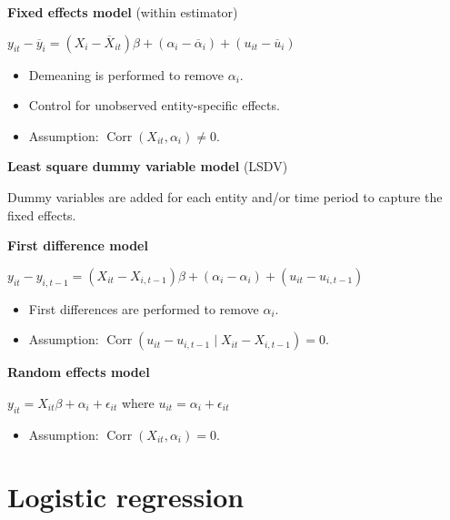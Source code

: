 \documentclass[10pt, a4paper, landscape]{article}
\DeclareMathOperator{\Corr}{Corr}
\begin{document}
\begin{multicols}{3}
\textbf{Fixed effects model} (within estimator)

\begin{center}
	\( y_{it} - \overline{y}_{i} = (X_{i} - \overline{X}_{it}) \beta + (\alpha_{i} - \overline{\alpha}_{i}) + (u_{it} - \overline{u}_{i}) \)
\end{center}

\begin{itemize}[leftmargin=*]
	\item Demeaning is performed to remove \( \alpha_{i} \).
	\item Control for unobserved entity-specific effects.
	\item Assumption: \( \Corr(X_{it}, \alpha_i) \neq 0 \).
\end{itemize}

\textbf{Least square dummy variable model} (LSDV)

Dummy variables are added for each entity and/or time period to capture the fixed effects.

\textbf{First difference model}

\begin{center}
	\( y_{it} - y_{i, t - 1} = (X_{it} - X_{i, t - 1}) \beta + (\alpha_{i} - \alpha_{i}) + (u_{it} - u_{i, t - 1}) \)
\end{center}

\begin{itemize}[leftmargin=*]
	\item First differences are performed to remove \( \alpha_{i} \).
	\item Assumption: \( \Corr(u_{it} - u_{i, t - 1} \mid X_{it} - X_{i, t - 1}) = 0 \).
\end{itemize}

\textbf{Random effects model}

\begin{center}
	\( y_{it} = X_{it} \beta + \alpha_{i} + \epsilon_{it} \) where \( u_{it} = \alpha_{i} + \epsilon_{it} \)
\end{center}

\begin{itemize}[leftmargin=*]
	\item Assumption: \( \Corr(X_{it}, \alpha_i) = 0 \).
\end{itemize}

\section*{Logistic regression}


\end{multicols}
\end{document}
